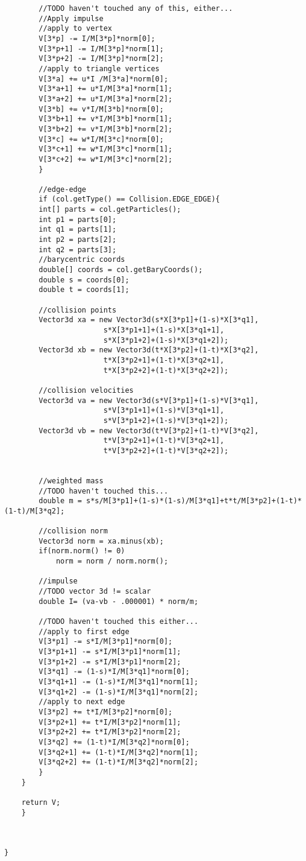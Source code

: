 \begin{lstlisting}
		//TODO haven't touched any of this, either...
		//Apply impulse
		//apply to vertex
		V[3*p] -= I/M[3*p]*norm[0];
		V[3*p+1] -= I/M[3*p]*norm[1];
		V[3*p+2] -= I/M[3*p]*norm[2];
		//apply to triangle vertices
		V[3*a] += u*I /M[3*a]*norm[0];
		V[3*a+1] += u*I/M[3*a]*norm[1];
		V[3*a+2] += u*I/M[3*a]*norm[2];
		V[3*b] += v*I/M[3*b]*norm[0];
		V[3*b+1] += v*I/M[3*b]*norm[1];
		V[3*b+2] += v*I/M[3*b]*norm[2];
		V[3*c] += w*I/M[3*c]*norm[0];
		V[3*c+1] += w*I/M[3*c]*norm[1];
		V[3*c+2] += w*I/M[3*c]*norm[2];
	    }

	    //edge-edge
	    if (col.getType() == Collision.EDGE_EDGE){
		int[] parts = col.getParticles();
		int p1 = parts[0];
		int q1 = parts[1];
		int p2 = parts[2];
		int q2 = parts[3];
		//barycentric coords
		double[] coords = col.getBaryCoords();
		double s = coords[0];
		double t = coords[1];

		//collision points
		Vector3d xa = new Vector3d(s*X[3*p1]+(1-s)*X[3*q1],
					   s*X[3*p1+1]+(1-s)*X[3*q1+1],
					   s*X[3*p1+2]+(1-s)*X[3*q1+2]);
		Vector3d xb = new Vector3d(t*X[3*p2]+(1-t)*X[3*q2],
					   t*X[3*p2+1]+(1-t)*X[3*q2+1],
					   t*X[3*p2+2]+(1-t)*X[3*q2+2]);

		//collision velocities
		Vector3d va = new Vector3d(s*V[3*p1]+(1-s)*V[3*q1],
					   s*V[3*p1+1]+(1-s)*V[3*q1+1],
					   s*V[3*p1+2]+(1-s)*V[3*q1+2]);
		Vector3d vb = new Vector3d(t*V[3*p2]+(1-t)*V[3*q2],
					   t*V[3*p2+1]+(1-t)*V[3*q2+1],
					   t*V[3*p2+2]+(1-t)*V[3*q2+2]);

		
		//weighted mass
		//TODO haven't touched this...
		double m = s*s/M[3*p1]+(1-s)*(1-s)/M[3*q1]+t*t/M[3*p2]+(1-t)*(1-t)/M[3*q2];
		
		//collision norm
		Vector3d norm = xa.minus(xb);
		if(norm.norm() != 0)
		    norm = norm / norm.norm();
		
		//impulse
		//TODO vector 3d != scalar
		double I= (va-vb - .000001) * norm/m;
		
		//TODO haven't touched this either...
		//apply to first edge
		V[3*p1] -= s*I/M[3*p1]*norm[0];
		V[3*p1+1] -= s*I/M[3*p1]*norm[1];
		V[3*p1+2] -= s*I/M[3*p1]*norm[2];
		V[3*q1] -= (1-s)*I/M[3*q1]*norm[0];
		V[3*q1+1] -= (1-s)*I/M[3*q1]*norm[1];
		V[3*q1+2] -= (1-s)*I/M[3*q1]*norm[2];
		//apply to next edge
		V[3*p2] += t*I/M[3*p2]*norm[0];
		V[3*p2+1] += t*I/M[3*p2]*norm[1];
		V[3*p2+2] += t*I/M[3*p2]*norm[2];
		V[3*q2] += (1-t)*I/M[3*q2]*norm[0];
		V[3*q2+1] += (1-t)*I/M[3*q2]*norm[1];
		V[3*q2+2] += (1-t)*I/M[3*q2]*norm[2];
	    }
	}

	return V;
    }



}\end{lstlisting}

